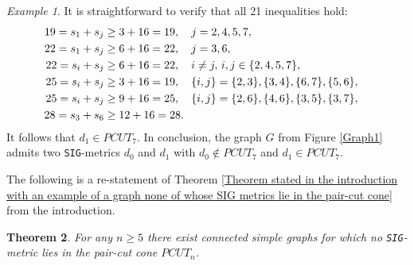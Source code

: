 \documentclass[12pt]{amsart}
\newtheorem{theorem}{Theorem}
\numberwithin{theorem}{section}
\theoremstyle{remark}
\newtheorem{example}[theorem]{Example}
\newcommand{\sigg}{{\tt SIG}}
\begin{document}
\begin{example}
%
It is straightforward to verify that all 21 inequalities hold:
\begin{align*}
 19 = s_1+s_j  & \ge 3+ 16 = 19, \quad j=2,4,5,7, \cr 
 22 = s_1+s_j  & \ge 6+ 16 = 22, \quad j=3, 6, \cr
 22 = s_i+s_j  & \ge 6+ 16 = 22, \quad i\ne j, \, i,j \in\{2,4,5,7\} , \cr
25 = s_i+s_j  & \ge 3+ 16 = 19, \quad \{i,j\} = \{2,3\}, \{3, 4\}, \{6,7\}, \{5,6\},  \cr
25 = s_i+s_j  & \ge 9+ 16 = 25, \quad \{i,j\} = \{2,6\}, \{4, 6\}, \{3, 5\}, \{3,7\},  \cr
28 = s_3+s_6  & \ge 12+ 16 = 28. 
\end{align*}
It follows that $d_1\in PCUT_7$. 
\vskip1mm
In conclusion, the graph $G$ from Figure \ref{Graph1} admits two \sigg-metrics $d_0$ and $d_1$ with $d_0\notin PCUT_7$ and $d_1\in PCUT_7$.  
\end{example}
The following is a re-statement of Theorem \ref{Theorem stated in the introduction with an example of a graph none of whose SIG metrics lie in the pair-cut cone} from the introduction. 
\begin{theorem}\label{Main Result on non-embeddings into the pair-cut-cone}
For any $n\ge 5$ there exist connected simple graphs for which no \sigg-metric lies in the pair-cut cone $PCUT_n$.   
\end{theorem}
\end{document}
